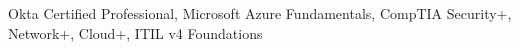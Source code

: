 
\begin{cvskills}

	\cvskill
	{}{Okta Certified Professional, Microsoft Azure Fundamentals, CompTIA Security+, Network+, Cloud+, ITIL v4 Foundations}

\end{cvskills}

